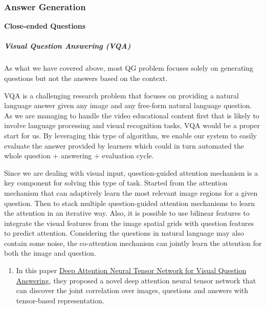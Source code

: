 \documentclass{acm_proc_article-sp}
\renewcommand{\paragraph}[1]{\vskip 6pt\noindent\textbf{#1 }}
\providecommand{\tightlist}{%
  \setlength{\itemsep}{0pt}\setlength{\parskip}{0pt}}
\begin{document}
\subsubsection{Answer Generation}\label{answer-generation}

\paragraph{Close-ended Questions}\label{close-ended-questions}

\subparagraph{Visual Question Answering
(VQA)}\label{visual-question-answering-vqa}

As what we have covered above, most QG problem focuses solely on
generating questions but not the answers based on the context.

VQA is a challenging research problem that focuses on providing a
natural language answer given any image and any free-form natural
language question. As we are managing to handle the video educational
content first that is likely to involve language processing and visual
recognition tasks, VQA would be a proper start for us. By leveraging
this type of algorithm, we enable our system to easily evaluate the
answer provided by learners which could in turn automated the whole
question + answering + evaluation cycle.

Since we are dealing with visual input, question-guided attention
mechanism is a key component for solving this type of task. Started from
the attention mechanism that can adaptively learn the most relevant
image regions for a given question. Then to stack multiple
question-guided attention mechanisms to learn the attention in an
iterative way. Also, it is possible to use bilinear features to
integrate the visual features from the image spatial grids with question
features to predict attention. Considering the questions in natural
language may also contain some noise, the co-attention mechanism can
jointly learn the attention for both the image and question.

\begin{enumerate}
\def\labelenumi{\arabic{enumi}.}
\tightlist
\item
  In this paper
  \href{http://openaccess.thecvf.com/content_ECCV_2018/papers/Yalong_Bai_Deep_Attention_Neural_ECCV_2018_paper.pdf}{Deep
  Attention Neural Tensor Network for Visual Question Answering}, they
  proposed a novel deep attention neural tensor network that can
  discover the joint correlation over images, questions and answers with
  tensor-based representation.
\end{enumerate}
\end{document}
